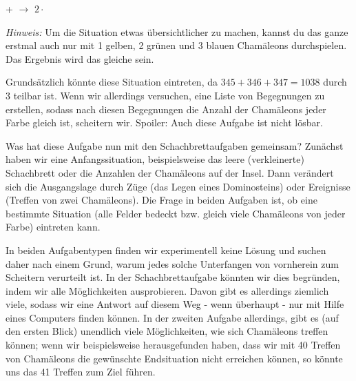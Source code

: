 \documentclass[a4paper,ngerman,12pt]{scrartcl}
\theoremstyle{definition}
\theoremstyle{plain}
\theoremstyle{remark}
\begin{document}
\begin{center}
	 +  $\longrightarrow$ $2 \cdot$ 
\end{center}

\emph{Hinweis:} Um die Situation etwas übersichtlicher zu machen, kannst du das ganze erstmal auch nur mit 1 gelben, 2 grünen und 3 blauen Chamäleons durchspielen. Das Ergebnis wird das gleiche sein.

Grundsätzlich könnte diese Situation eintreten, da $345 + 346 + 347 = 1038$ durch $3$ teilbar ist. Wenn wir allerdings versuchen, eine Liste von Begegnungen zu erstellen, sodass nach diesen Begegnungen die Anzahl der Chamäleons jeder Farbe gleich ist, scheitern wir. Spoiler: Auch diese Aufgabe ist nicht lösbar.

Was hat diese Aufgabe nun mit den Schachbrettaufgaben gemeinsam? Zunächst haben wir eine Anfangssituation, beispielsweise das leere (verkleinerte) Schachbrett oder die Anzahlen der Chamäleons auf der Insel. Dann verändert sich die Ausgangslage durch Züge (das Legen eines Dominosteins) oder Ereignisse (Treffen von zwei Chamäleons). Die Frage in beiden Aufgaben ist, ob eine bestimmte Situation (alle Felder bedeckt bzw. gleich viele Chamäleons von jeder Farbe) eintreten kann.

In beiden Aufgabentypen finden wir experimentell keine Lösung und suchen daher nach einem Grund, warum jedes solche Unterfangen von vornherein zum Scheitern verurteilt ist. In der Schachbrettaufgabe könnten wir dies begründen, indem wir alle Möglichkeiten ausprobieren. Davon gibt es allerdings ziemlich viele, sodass wir eine Antwort auf diesem Weg - wenn überhaupt - nur mit Hilfe eines Computers finden können. In der zweiten Aufgabe allerdings, gibt es (auf den ersten Blick) unendlich viele Möglichkeiten, wie sich Chamäleons treffen können; wenn wir beispielsweise herausgefunden haben, dass wir mit 40 Treffen von Chamäleons die gewünschte Endsituation nicht erreichen können, so könnte uns das 41 Treffen zum Ziel führen.
\end{document}
